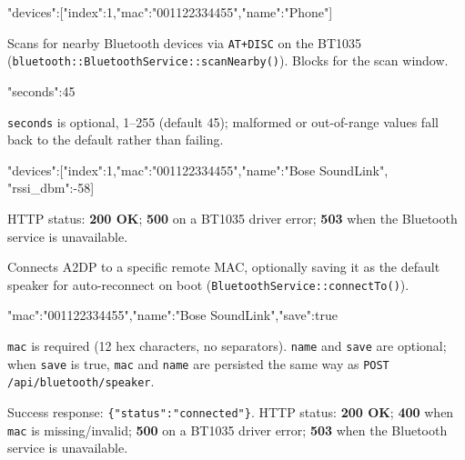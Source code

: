 \begin{drnote}
\begin{drcode}[JSON]
{"devices":[{"index":1,"mac":"001122334455","name":"Phone"}]}
\end{drcode}
\end{drnote}

\label{sec:api-bluetooth-scan}

Scans for nearby Bluetooth devices via \texttt{AT+DISC} on the BT1035
(\texttt{bluetooth::BluetoothService::scanNearby()}). Blocks for the scan
window.

\begin{drnote}
\begin{drcode}[JSON]
{"seconds":45}
\end{drcode}
\texttt{seconds} is optional, 1--255 (default 45); malformed or
out-of-range values fall back to the default rather than failing.
\end{drnote}

\begin{drnote}
\begin{drcode}[JSON]
{"devices":[{"index":1,"mac":"001122334455","name":"Bose SoundLink",
             "rssi_dbm":-58}]}
\end{drcode}
\end{drnote}

HTTP status: \textbf{200 OK}; \textbf{500} on a BT1035 driver error;
\textbf{503} when the Bluetooth service is unavailable.

\label{sec:api-bluetooth-connect}

Connects A2DP to a specific remote MAC, optionally saving it as the
default speaker for auto-reconnect on boot
(\texttt{BluetoothService::connectTo()}).

\begin{drnote}
\begin{drcode}[JSON]
{"mac":"001122334455","name":"Bose SoundLink","save":true}
\end{drcode}
\texttt{mac} is required (12 hex characters, no separators). \texttt{name}
and \texttt{save} are optional; when \texttt{save} is true, \texttt{mac}
and \texttt{name} are persisted the same way as
\texttt{POST /api/bluetooth/speaker}.
\end{drnote}

Success response: \texttt{\{"status":"connected"\}}. HTTP status:
\textbf{200 OK}; \textbf{400} when \texttt{mac} is missing/invalid;
\textbf{500} on a BT1035 driver error; \textbf{503} when the Bluetooth
service is unavailable.

